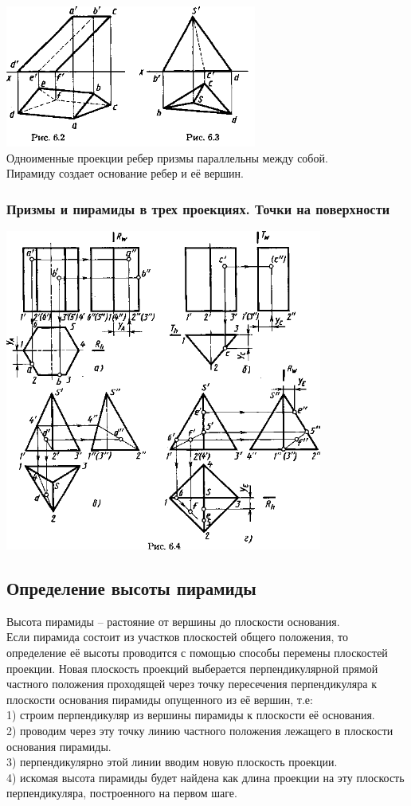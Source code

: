 \documentclass[a4paper, 12pt]{article}
\begin{document}
\includegraphics{img/621.png}\\

Одноименные проекции ребер призмы параллельны между собой.\\
Пирамиду создает основание ребер и её вершин.

\subsubsection*{Призмы и пирамиды в трех проекциях. Точки на поверхности}
\includegraphics{img/622.png}\\

\subsection{Определение высоты пирамиды}

Высота пирамиды -- растояние от вершины до плоскости основания.\\
Если пирамида состоит из участков плоскостей общего положения, то определение её высоты проводится с помощью способы перемены плоскостей проекции. Новая плоскость проекций выберается перпендикулярной прямой частного положения проходящей через точку пересечения перпендикуляра к плоскости основания пирамиды опущенного из её вершин, т.е:\\
1) строим перпендикуляр из вершины пирамиды к плоскости её основания.\\
2) проводим через эту точку линию частного положения лежащего в плоскости основания пирамиды.\\
3) перпендикулярно этой линии вводим новую плоскость проекции.\\
4) искомая высота пирамиды будет найдена как длина проекции на эту плоскость перпендикуляра, построенного на первом шаге.\\
\end{document}
